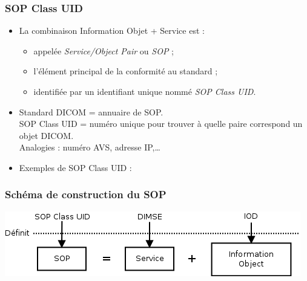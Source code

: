 	\frame
	{
		\frametitle{SOP Class UID}

		\begin{itemize}
			\item La combinaison Information Objet + Service est :
			\begin{itemize}
				\item<2-> appel\'ee \emph{Service/Object Pair} ou \emph{SOP} ;
				\item<3-> l'\'el\'ement principal de la conformit\'e au standard ;
				\item<4-> identifi\'ee par un identifiant unique nomm\'e \emph{SOP Class UID}.
			\end{itemize}
		
			\item<5-> Standard DICOM = annuaire de SOP.\\
			SOP Class UID = num\'ero unique pour trouver \`a quelle paire correspond un objet DICOM.\\
			Analogies : num\'ero AVS, adresse IP,\ldots

			\item<6-> Exemples de SOP Class UID :
		\end{itemize}
	}
	
	\frame
	{
		\frametitle{Sch\'ema de construction du SOP}
		\begin{center}
			\includegraphics[width=\linewidth]{./figures/sop-definition.png}
		\end{center}		
	}

